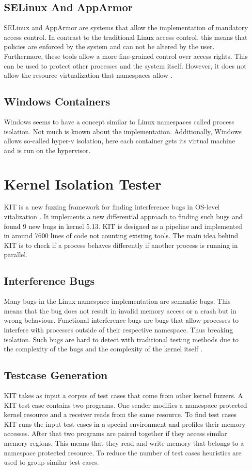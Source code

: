 \documentclass[10pt,twocolumn,a4paper]{article}
\begin{document}
\subsection{SELinux And AppArmor}
SELinux and AppArmor are systems that allow the implementation of mandatory access control. In
contrast to the traditional Linux access control, this means that policies are enforced by the system
and can not be altered by the user. Furthermore, these tools allow a more fine-grained control over
access rights. This can be used to protect other processes and the system itself. However, it does not allow the resource
virtualization that namespaces allow \cite{26,27}. 
\subsection{Windows Containers}
Windows seems to have a concept similar to Linux namespaces called process isolation. Not much is known about the
implementation. Additionally, Windows allows so-called hyper-v isolation, here each container
gets its virtual machine and is run on the hypervisor\cite{3}.

\section{Kernel Isolation Tester}
KIT is a new fuzzing framework for finding interference bugs in OS-level vitalization \cite{0}. 
It implements a new differential approach to finding such bugs and found 9 new bugs in kernel 5.13\cite{2}.
KIT is designed as a pipeline and implemented in around 7600 lines of code not counting existing tools\cite{0}.
The main idea behind KIT is to check if a process behaves differently if another process is running
in parallel.

\subsection{Interference Bugs}
Many bugs in the Linux namespace implementation are semantic bugs.
This means that the bug does not result in invalid memory access or a crash but in wrong behaviour. 
Functional interference bugs are bugs that allow processes to interfere with processes outside of their respective namespace.
Thus breaking isolation. Such bugs are hard to detect with traditional testing methods due to the
complexity of the bugs and the complexity of the kernel itself \cite{0}. 

\subsection{Testcase Generation}
KIT takes as input a corpus of test cases that come from other kernel fuzzers.
A KIT test case contains two programs. One sender modifies a namespace protected kernel
resource and a receiver reads from the same resource. To find test cases KIT runs the input test cases in a special environment and profiles their memory accesses. 
After that two programs are paired together if they access similar memory regions. 
This means that they read and write memory that belongs to a namespace protected resource.
To reduce the number of test cases heuristics are used to group similar test cases.
\end{document}
